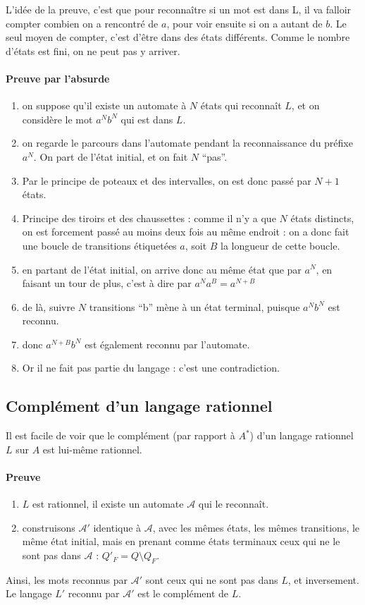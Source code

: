 \documentclass[10pt,twoside]{article}
\begin{document}
L'idée de la preuve, c'est que pour reconnaître si un mot est dans L,
il va falloir compter combien on a rencontré de $a$, pour voir ensuite 
si on a
autant de $b$. Le seul moyen de compter, c'est d'être dans des états
différents. Comme le nombre d'états est fini, on ne peut pas y
arriver.




\paragraph{Preuve par l'absurde}
\begin{enumerate}
\item on suppose qu'il existe un automate à $N$ états qui reconnaît
  $L$, et on considère le mot $a^N b^N$ qui est dans $L$.
\item on regarde le parcours dans l'automate pendant la reconnaissance du
préfixe $a^N$. On part de l'état initial, et on fait $N$ ``pas''.
\item Par le principe de poteaux et des intervalles, on est donc passé par
$N+1$ états. 
\item Principe des tiroirs et des chaussettes : comme il n'y a que 
$N$ états distincts, on est forcement passé au moins deux fois au 
même endroit : on a donc fait une boucle de transitions étiquetées $a$, soit $B$ la longueur de cette boucle.
\item en partant de l'état initial, on arrive donc au même état que par $a^N$, en
faisant un tour de plus, c'est à dire par $a^Na^B = a^{N+B}$
\item de là,  suivre $N$ transitions  ``b''  mène à un état terminal, 
puisque $a^Nb^N$ est reconnu.
\item donc $a^{N+B}b^N$ est également reconnu par l'automate.
\item Or il ne fait pas partie du langage : c'est une contradiction.
\end{enumerate}


\subsection{Complément d'un langage rationnel}

Il est facile de voir que le complément (par rapport à $A^*$) d'un langage
rationnel $L$ sur $A$ est lui-même rationnel.


\paragraph{Preuve}
\begin{enumerate}
\item $L$ est rationnel, il existe un automate $\mathcal{A}$ qui le reconnaît.
\item construisons $\mathcal{A'}$ identique à $\mathcal{A}$, avec les mêmes états,
les mêmes transitions, le même état initial, mais en prenant comme états
terminaux ceux qui ne le sont pas dans $\mathcal{A}$ :
$ Q'_F = Q \setminus Q_F$.
\end{enumerate}
Ainsi, les mots reconnus par $\mathcal{A'}$ sont ceux qui ne sont pas dans $L$,
et inversement. Le langage $L'$ reconnu par $\mathcal{A'}$ est le complément de $L$.
\end{document}
